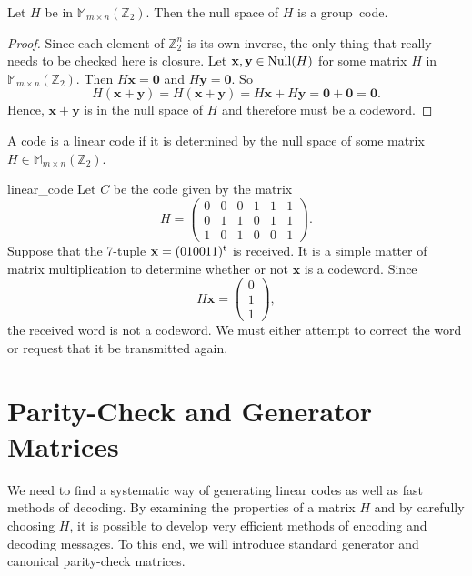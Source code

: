  
\begin{theorem}
Let $H$ be in ${\mathbb M}_{m \times n}({\mathbb Z}_2)$. Then the null space of
$H$ is a group~code. 
\end{theorem}
 
 
\begin{proof}
Since each element of ${\mathbb Z}_2^n$ is its own inverse, the only
thing that really needs to be checked here is closure. Let ${\mathbf x},
{\mathbf y} \in {\rm Null}(H)$ for some matrix $H$ in ${\mathbb M}_{m \times
n}({\mathbb Z}_2)$. Then $H{\mathbf x} = {\mathbf 0}$ and $H{\mathbf y} =
{\mathbf 0}$. So 
\[
H({\mathbf x}+{\mathbf y}) = H({\mathbf x} +{\mathbf y})
=
H{\mathbf x} + H{\mathbf y} = {\mathbf 0}
+
{\mathbf 0}
= {\mathbf 0}.
\]
Hence, ${\mathbf x}+{\mathbf y}$ is in the null space of $H$ and
therefore must be a codeword. 
\hspace*{1in}
\end{proof}
 
 
\medskip
 
 
A code is a {\bfi linear code\/} if it is
determined by the null space of some matrix $H \in {\mathbb M}_{m \times
n}({\mathbb Z}_2)$.  
 
 
 
\begin{example}{linear_code}
Let $C$ be the code given by the matrix
\[
H =
\begin{pmatrix}
0 & 0 & 0 & 1 & 1 & 1 \\
0 & 1 & 1 & 0 & 1 & 1 \\
1 & 0 & 1 & 0 & 0 & 1
\end{pmatrix}.
\]
Suppose that the 7-tuple ${\mathbf x} = (010011)^{\rm t}$ is received.
It is a simple matter of matrix multiplication to determine whether or
not ${\mathbf x}$ is a codeword. Since 
\[
H{\mathbf x} =
\begin{pmatrix} 
0 \\ 1 \\ 1
\end{pmatrix},
\]
the received word is not a codeword.  We must either attempt to
correct the word or request that it be transmitted again.
\end{example}
 
 
 
\section{Parity-Check and Generator Matrices}
 
 
We need to find a systematic way of generating linear codes as well as
fast methods of decoding. By examining the properties of a matrix $H$
and by carefully choosing $H$, it is possible to develop very
efficient methods of encoding and decoding messages. To this end, we 
will introduce standard generator and canonical parity-check
matrices.
 
